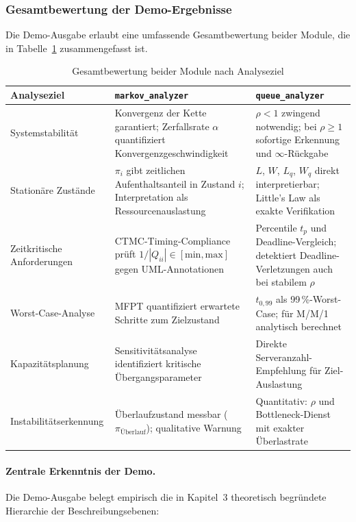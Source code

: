 ﻿\documentclass[a4paper,12pt]{scrreprt}
\theoremstyle{definition}
\begin{document}
\subsubsection{Gesamtbewertung der Demo-Ergebnisse}

Die Demo-Ausgabe erlaubt eine umfassende Gesamtbewertung beider Module,
die in Tabelle~\ref{tab:gesamtbewertung} zusammengefasst ist.

\begin{table}[H]
	\centering
	\begin{tabular}{@{}p{4cm}p{5cm}p{5cm}@{}}
		\toprule
		\textbf{Analyseziel} & \textbf{\texttt{markov\_analyzer}} &
		\textbf{\texttt{queue\_analyzer}} \\
		\midrule
		Systemstabilität & Konvergenz der Kette garantiert;
		Zerfallsrate $\alpha$ quantifiziert Konvergenzgeschwindigkeit &
		$\rho < 1$ zwingend notwendig; bei $\rho \geq 1$ sofortige
		Erkennung und $\infty$-Rückgabe \\
		\addlinespace
		Stationäre Zustände & $\pi_i$ gibt zeitlichen Aufenthaltsanteil
		in Zustand $i$; Interpretation als Ressourcenauslastung &
		$L$, $W$, $L_q$, $W_q$ direkt interpretierbar;
		Little's Law als exakte Verifikation \\
		\addlinespace
		Zeitkritische Anforderungen & CTMC-Timing-Compliance prüft
		$1/|Q_{ii}| \in [\text{min}, \text{max}]$ gegen UML-Annotationen &
		Percentile $t_p$ und Deadline-Vergleich; detektiert
		Deadline-Verletzungen auch bei stabilem $\rho$ \\
		\addlinespace
		Worst-Case-Analyse & MFPT quantifiziert erwartete Schritte
		zum Zielzustand & $t_{0{,}99}$ als 99\,\%-Worst-Case;
		für M/M/1 analytisch berechnet \\
		\addlinespace
		Kapazitätsplanung & Sensitivitätsanalyse identifiziert kritische
		Übergangsparameter & Direkte Serveranzahl-Empfehlung
		für Ziel-Auslastung \\
		\addlinespace
		Instabilitätserkennung & Überlaufzustand messbar ($\pi_\text{Überlauf}$);
		qualitative Warnung & Quantitativ: $\rho$ und Bottleneck-Dienst
		mit exakter Überlastrate \\
		\bottomrule
	\end{tabular}
	\caption{Gesamtbewertung beider Module nach Analyseziel}
	\label{tab:gesamtbewertung}
\end{table}

\paragraph{Zentrale Erkenntnis der Demo.}
Die Demo-Ausgabe belegt empirisch die in Kapitel~3 theoretisch begründete
Hierarchie der Beschreibungsebenen:
\end{document}
